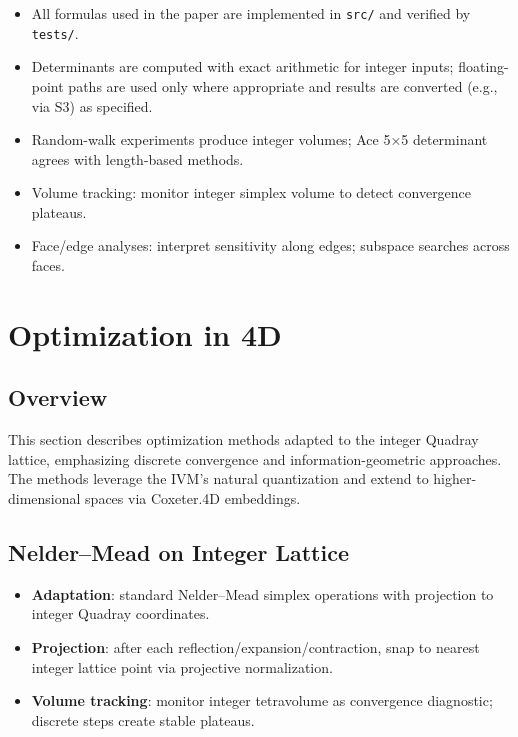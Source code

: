 \documentclass[
  10pt,
]{article}
\newcommand{\passthrough}[1]{#1}
\providecommand{\tightlist}{%
  \setlength{\itemsep}{0pt}\setlength{\parskip}{0pt}}
\begin{document}
\begin{itemize}
\tightlist
\item
  All formulas used in the paper are implemented in
  \passthrough{\lstinline!src/!} and verified by
  \passthrough{\lstinline!tests/!}.
\item
  Determinants are computed with exact arithmetic for integer inputs;
  floating-point paths are used only where appropriate and results are
  converted (e.g., via S3) as specified.
\item
  Random-walk experiments produce integer volumes; Ace 5×5 determinant
  agrees with length-based methods.
\item
  Volume tracking: monitor integer simplex volume to detect convergence
  plateaus.
\item
  Face/edge analyses: interpret sensitivity along edges; subspace
  searches across faces.
\end{itemize}

\newpage

\hypertarget{optimization-in-4d}{%
\section{Optimization in 4D}\label{optimization-in-4d}}

\hypertarget{overview-1}{%
\subsection{Overview}\label{overview-1}}

This section describes optimization methods adapted to the integer
Quadray lattice, emphasizing discrete convergence and
information-geometric approaches. The methods leverage the IVM's natural
quantization and extend to higher-dimensional spaces via Coxeter.4D
embeddings.

\hypertarget{neldermead-on-integer-lattice}{%
\subsection{Nelder--Mead on Integer
Lattice}\label{neldermead-on-integer-lattice}}

\begin{itemize}
\tightlist
\item
  \textbf{Adaptation}: standard Nelder--Mead simplex operations with
  projection to integer Quadray coordinates.
\item
  \textbf{Projection}: after each reflection/expansion/contraction, snap
  to nearest integer lattice point via projective normalization.
\item
  \textbf{Volume tracking}: monitor integer tetravolume as convergence
  diagnostic; discrete steps create stable plateaus.
\end{itemize}
\end{document}
